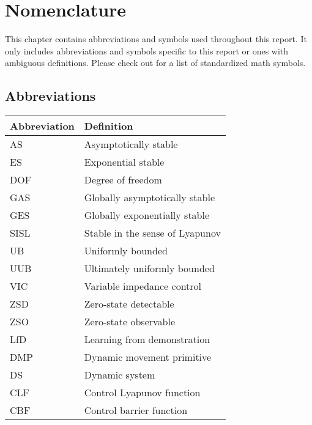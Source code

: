 \chapter*{Nomenclature}

This chapter contains abbreviations and symbols used throughout this report. It only includes abbreviations and symbols specific to this report or ones with ambiguous definitions. Please check out \cite{ListMathematicalSymbols2022} for a list of standardized math symbols.

\section*{Abbreviations}

\begin{longtable}{p{2.5cm}p{8cm}}
    \toprule
    Abbreviation & Definition                      \\
    \midrule\endhead %
    AS           & Asymptotically stable           \\
    ES           & Exponential stable              \\
    DOF          & Degree of freedom               \\
    GAS          & Globally asymptotically stable  \\
    GES          & Globally exponentially  stable  \\
    SISL         & Stable in the sense of Lyapunov \\
    UB           & Uniformly bounded               \\
    UUB          & Ultimately uniformly bounded    \\
    VIC          & Variable impedance control      \\
    ZSD          & Zero-state detectable           \\
    ZSO          & Zero-state observable           \\
    LfD          & Learning from demonstration     \\
    DMP          & Dynamic movement primitive      \\
    DS           & Dynamic system                  \\   
    CLF          & Control Lyapunov function       \\
    CBF          & Control barrier function        \\
    \bottomrule
\end{longtable}

